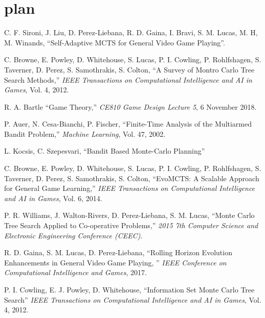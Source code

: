 \documentclass[conference]{IEEEtran}
\begin{document}
\section{plan}

\begin{thebibliography}{9}

C. F. Sironi, J. Liu, D. Perez-Liebana, R. D. Gaina, I. Bravi, S. M. Lucas, M. H, M. Winands, ``Self-Adaptive MCTS for General Video Game Playing''. 

C. Browne, E. Powley, D. Whitehouse, S. Lucas, P. I. Cowling, P. Rohlfshagen, S. Taverner, D. Perez, S. Samothrakis, S. Colton,  
``A Survey of Montro Carlo Tree Search Methods,'' 
{\em IEEE Transactions on Computational Intelligence and AI in Games}, Vol. 4, 2012.

R. A. Bartle ``Game Theory,'' {\em CE810 Game Design Lecture 5}, 6 November 2018. 

P. Auer, N. Cesa-Bianchi, P. Fischer, ``Finite-Time Analysis of the Multiarmed Bandit Problem,'' {\em Machine Learning}, Vol. 47, 2002.

L. Kocsis, C. Szepesvari, ``Bandit Based Monte-Carlo Planning'' 

C. Browne, E. Powley, D. Whitehouse, S. Lucas, P. I. Cowling, P. Rohlfshagen, S. Taverner, D. Perez, S. Samothrakis, S. Colton,  
``EvoMCTS: A Scalable Approach for General Game Learning,'' 
{\em IEEE Transactions on Computational Intelligence and AI in Games}, Vol. 6, 2014.

P. R. Williams, J. Walton-Rivers, D. Perez-Liebana, S. M. Lucas, ``Monte Carlo Tree Search Applied to Co-operative Problems,'' {\em 2015 7th Computer Science and Electronic Engineering Conference (CEEC)}.

R. D. Gaina, S. M. Lucas, D. Perez-Liebana, ``Rolling Horizon Evolution Enhancements in General Video Game Playing, '' {\em IEEE Conference on Computational Intelligence and Games}, 2017.

P. I. Cowling, E. J. Powley, D. Whitehouse, 
``Information Set Monte Carlo Tree Search'' 
{\em IEEE Transactions on Computational Intelligence and AI in Games}, Vol. 4, 2012.


\end{thebibliography}
\end{document}
